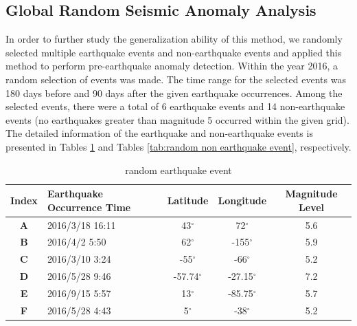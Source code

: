 \documentclass[3p,authoryear,preprint,12pt]{elsarticle}
\begin{document}
\subsection{Global Random Seismic Anomaly Analysis}
{In order to further study the generalization ability of this method, we randomly selected multiple earthquake events and non-earthquake events and applied this method to perform pre-earthquake anomaly detection.} {Within the year 2016, a random selection of events was made.} The time range for the selected events was 180 days before and 90 days after the given earthquake occurrences. Among the selected events, there were a total of 6 earthquake events and 14 non-earthquake events (no earthquakes greater than magnitude 5 occurred within the given grid). The detailed information of the earthquake and non-earthquake events is presented in Tables \ref{tab:random earthquake event} and Tables \ref{tab:random non earthquake event}, respectively.
\begin{table}[htbp]
	\caption{random earthquake event}
	\label{tab:random earthquake event}
	\centering
	\begin{tabular}{clccc}
		\toprule
		\textbf{Index} & \textbf{Earthquake Occurrence Time} &\textbf{Latitude}&\textbf{Longitude}&\textbf{Magnitude Level} \\
		\midrule
		\textbf{A}&2016/3/18 16:11 & 43$^\circ$     & 72$^\circ$     & 5.6  \\
		\textbf{B}&2016/4/2 5:50   & 62$^\circ$     & -155$^\circ$   & 5.9  \\
		\textbf{C}&2016/3/10 3:24  & -55$^\circ$    & -66$^\circ$    & 5.2  \\
		\textbf{D}&2016/5/28 9:46  & -57.74$^\circ$ & -27.15$^\circ$ & 7.2 \\
		\textbf{E}&2016/9/15 5:57  & 13$^\circ$     & -85.75$^\circ$ & 5.7 \\
		\textbf{F}&2016/5/28 4:43  & 5$^\circ$      & -38$^\circ$    & 5.2 \\
		\bottomrule
	\end{tabular}
\end{table}
\end{document}
